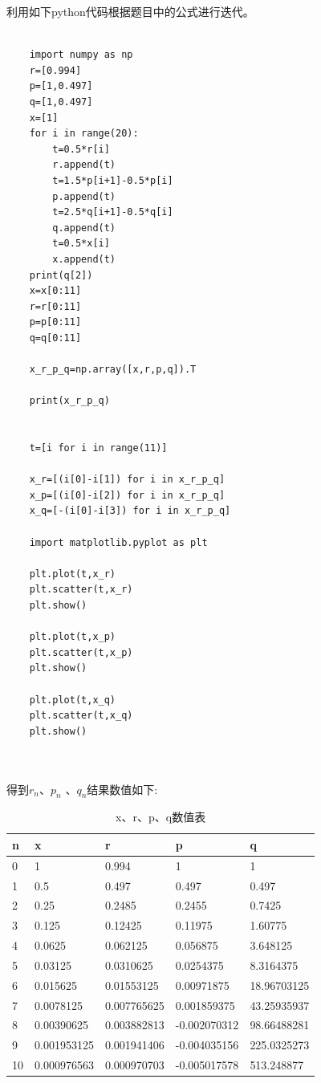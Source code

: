 \documentclass[UTF8]{ctexart}
\begin{document}
利用如下python代码根据题目中的公式进行迭代。
\begin{lstlisting}

	import numpy as np
	r=[0.994]
	p=[1,0.497]
	q=[1,0.497]
	x=[1]
	for i in range(20):
	    t=0.5*r[i]
	    r.append(t)
	    t=1.5*p[i+1]-0.5*p[i]
	    p.append(t)
	    t=2.5*q[i+1]-0.5*q[i]
	    q.append(t)
	    t=0.5*x[i]
	    x.append(t)
	print(q[2])
	x=x[0:11]
	r=r[0:11]
	p=p[0:11]
	q=q[0:11]

	x_r_p_q=np.array([x,r,p,q]).T

	print(x_r_p_q)


	t=[i for i in range(11)]

	x_r=[(i[0]-i[1]) for i in x_r_p_q]
	x_p=[(i[0]-i[2]) for i in x_r_p_q]
	x_q=[-(i[0]-i[3]) for i in x_r_p_q]

	import matplotlib.pyplot as plt

	plt.plot(t,x_r)
	plt.scatter(t,x_r)
	plt.show()

	plt.plot(t,x_p)
	plt.scatter(t,x_p)
	plt.show()

	plt.plot(t,x_q)
	plt.scatter(t,x_q)
	plt.show()

	
\end{lstlisting}


得到$ r_n $、$ p_n$ 、$ q_n $结果数值如下:


\begin{table}[H]
\caption{x、r、p、q数值表}
\begin{tabular}{|l|l|l|l|l|}
\hline

n & x & r & p & q \\ \hline
0 & 1 & 0.994 & 1 & 1 \\ \hline
1 & 0.5 & 0.497 & 0.497 & 0.497 \\ \hline
2 & 0.25 & 0.2485 & 0.2455 & 0.7425 \\ \hline
3 & 0.125 & 0.12425 & 0.11975 & 1.60775 \\ \hline
4 & 0.0625 & 0.062125 & 0.056875 & 3.648125 \\ \hline
5 & 0.03125 & 0.0310625 & 0.0254375 & 8.3164375 \\ \hline
6 & 0.015625 & 0.01553125 & 0.00971875 & 18.96703125 \\ \hline
7 & 0.0078125 & 0.007765625 & 0.001859375 & 43.25935937 \\ \hline
8 & 0.00390625 & 0.003882813 & -0.002070312 & 98.66488281 \\ \hline
9 & 0.001953125 & 0.001941406 & -0.004035156 & 225.0325273 \\ \hline
10 & 0.000976563 & 0.000970703 & -0.005017578 & 513.248877 \\ \hline

\end{tabular}
\end{table}
\end{document}
